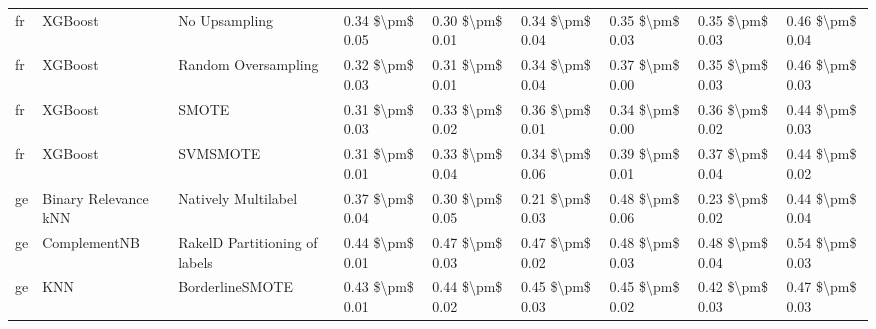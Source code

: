 \begin{tabular}{lllllllll}
      fr &                         XGBoost &                 No Upsampling & 0.34 \$\textbackslash pm\$ 0.05 &           0.30 \$\textbackslash pm\$ 0.01 &       0.34 \$\textbackslash pm\$ 0.04 &        0.35 \$\textbackslash pm\$ 0.03 &                         0.35 \$\textbackslash pm\$ 0.03 &     0.46 \$\textbackslash pm\$ 0.04 \\
      fr &                         XGBoost &           Random Oversampling & 0.32 \$\textbackslash pm\$ 0.03 &           0.31 \$\textbackslash pm\$ 0.01 &       0.34 \$\textbackslash pm\$ 0.04 &        0.37 \$\textbackslash pm\$ 0.00 &                         0.35 \$\textbackslash pm\$ 0.03 &     0.46 \$\textbackslash pm\$ 0.03 \\
      fr &                         XGBoost &                         SMOTE & 0.31 \$\textbackslash pm\$ 0.03 &           0.33 \$\textbackslash pm\$ 0.02 &       0.36 \$\textbackslash pm\$ 0.01 &        0.34 \$\textbackslash pm\$ 0.00 &                         0.36 \$\textbackslash pm\$ 0.02 &     0.44 \$\textbackslash pm\$ 0.03 \\
      fr &                         XGBoost &                      SVMSMOTE & 0.31 \$\textbackslash pm\$ 0.01 &           0.33 \$\textbackslash pm\$ 0.04 &       0.34 \$\textbackslash pm\$ 0.06 &        0.39 \$\textbackslash pm\$ 0.01 &                         0.37 \$\textbackslash pm\$ 0.04 &     0.44 \$\textbackslash pm\$ 0.02 \\
      ge &            Binary Relevance kNN &           Natively Multilabel & 0.37 \$\textbackslash pm\$ 0.04 &           0.30 \$\textbackslash pm\$ 0.05 &       0.21 \$\textbackslash pm\$ 0.03 &        0.48 \$\textbackslash pm\$ 0.06 &                         0.23 \$\textbackslash pm\$ 0.02 &     0.44 \$\textbackslash pm\$ 0.04 \\
      ge &                    ComplementNB & RakelD Partitioning of labels & 0.44 \$\textbackslash pm\$ 0.01 &           0.47 \$\textbackslash pm\$ 0.03 &       0.47 \$\textbackslash pm\$ 0.02 &        0.48 \$\textbackslash pm\$ 0.03 &                         0.48 \$\textbackslash pm\$ 0.04 &     0.54 \$\textbackslash pm\$ 0.03 \\
      ge &                             KNN &               BorderlineSMOTE & 0.43 \$\textbackslash pm\$ 0.01 &           0.44 \$\textbackslash pm\$ 0.02 &       0.45 \$\textbackslash pm\$ 0.03 &        0.45 \$\textbackslash pm\$ 0.02 &                         0.42 \$\textbackslash pm\$ 0.03 &     0.47 \$\textbackslash pm\$ 0.03 \\

\end{tabular}
